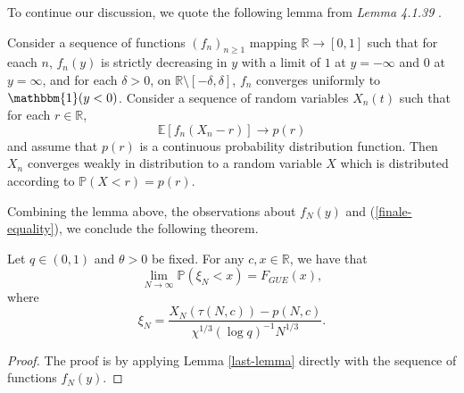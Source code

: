 To continue our discussion, we quote the following lemma from \textit{\cite{macdonald2014} Lemma 4.1.39 }. 
\begin{lemma}
\label{last-lemma}
Consider a sequence of functions $(f_n)_{n \ge 1}$ mapping $\mathbb{R} \rightarrow [0,1]$ such that for eaach $n$, $f_n(y)$ is strictly decreasing in $y$ with a limit of $1$ at $y = -\infty$ and $0$ at $y = \infty$, and for each $\delta > 0$, on $\mathbb{R} \setminus [-\delta, \delta]$, $f_n$ converges uniformly to $\mathbbm{1}(y < 0)$. Consider a sequence of random variables $X_n(t)$ such that for each $r \in \mathbb{R}$, $$\mathbb{E} [f_n(X_n - r)] \rightarrow p(r)$$ and assume that $p(r)$ is a continuous probability distribution function. Then $X_n$ converges weakly in distribution to a random variable $X$ which is distributed according to $\mathbb{P}(X < r) = p(r)$.
\end{lemma}

Combining the lemma above, the observations about $f_N(y)$ and (\ref{finale-equality}), we conclude the following theorem.
\begin{theorem}
Let $q \in (0,1)$ and $\theta > 0$ be fixed. For any $c, x \in \mathbb{R}$, we have that $$\lim_{N \rightarrow \infty} \mathbb{P}(\xi_N < x) = F_{GUE}(x),$$ where $$\xi_N = \frac{X_N(\tau(N,c)) - p(N,c)}{\chi^{1/3} (\log q)^{-1} N^{1/3}}.$$
\end{theorem}
\begin{proof}
The proof is by applying Lemma \ref{last-lemma} directly with the sequence of functions $f_N(y)$.
\end{proof}